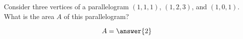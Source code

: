 \documentclass{ximera}
\author{Gregory Hartman \and Matthew Carr}
\begin{document}
\begin{exercise}

Consider three vertices of a parallelogram $(1,1,1)$, $(1,2,3)$, and $(1,0,1)$. What is the area $A$ of this parallelogram?

\begin{prompt}
\[
A=\answer{2}
\]
\end{prompt}


\end{exercise}
\end{document}
